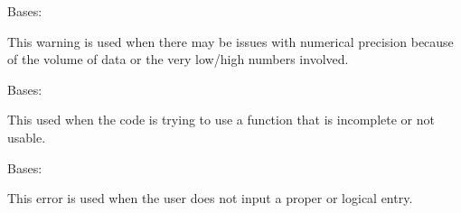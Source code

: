 \documentclass[letterpaper,10pt,english]{sphinxmanual}
\begin{document}

\begin{fulllineitems}
\label{\detokenize{python_docstrings/IfA_Smeargle.meta.errors:IfA_Smeargle.meta.errors.ImprecisionWarning}}
Bases: {\hyperref[\detokenize{python_docstrings/IfA_Smeargle.meta.errors:IfA_Smeargle.meta.errors.Smeargle_Warning}]{}}

This warning is used when there may be issues with numerical precision
because of the volume of data or the very low/high numbers involved.

\end{fulllineitems}


\begin{fulllineitems}
\label{\detokenize{python_docstrings/IfA_Smeargle.meta.errors:IfA_Smeargle.meta.errors.IncompleteError}}
Bases: {\hyperref[\detokenize{python_docstrings/IfA_Smeargle.meta.errors:IfA_Smeargle.meta.errors.Smeargle_BaseException}]{}}

This used when the code is trying to use a function that is incomplete or
not usable.

\end{fulllineitems}


\begin{fulllineitems}
\label{\detokenize{python_docstrings/IfA_Smeargle.meta.errors:IfA_Smeargle.meta.errors.InputError}}
Bases: {\hyperref[\detokenize{python_docstrings/IfA_Smeargle.meta.errors:IfA_Smeargle.meta.errors.Smeargle_Exception}]{}}

This error is used when the user does not input a proper or logical entry.

\end{fulllineitems}
\end{document}
